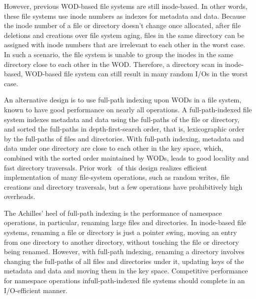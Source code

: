 However, previous WOD-based file systems are still inode-based.
In other words, these file systems use inode numbers as indexes for
metadata and data.
Because the inode number of a file or directory doesn't change once allocated,
after file deletions and creations over file system aging,
files in the same directory can be assigned with inode numbers that are
irrelevant to each other in the worst case.
In such a scenario, the file system is unable to group the inodes in the
same directory close to each other in the WOD.
Therefore, a directory scan in inode-based, WOD-based file system can still
result in many random I/Os in the worst case.

An alternative design is to use full-path indexing upon WODs in a file system,
known to have good performance on nearly all operations.
A full-path-indexed file system indexes metadata and data
using the full-paths of the file or directory,
and sorted the full-paths in depth-first-search order,
that is, lexicographic order by the full-paths of files and directories.
With full-path indexing, metadata and data under one directory are close to each
other in the key space, which, combined with the sorted order maintained by
WODs, leads to good locality and fast directory traversals.
Prior work~\citep{betrfs1,betrfs1tos,betrfs2,betrfs2tos,betrfs3} of this design
realizes efficient implementation of many file-system operations, such as random
writes, file creations and directory traversals,
but a few operations have prohibitively high overheads.

The Achilles' heel of full-path indexing is the performance of namespace
operations, in particular, renaming large files and directories.
In inode-based file systems,
renaming a file or directory is just a pointer swing,
moving an entry from one directory to another directory,
without touching the file or directory being renamed.
However, with full-path indexing, renaming a directory involves changing the
full-paths of all files and directories under it,
updating keys of the metadata and data and moving them in the key space.
Competitive performance for namespace operations infull-path-indexed file
systems should complete in an I/O-efficient manner.

